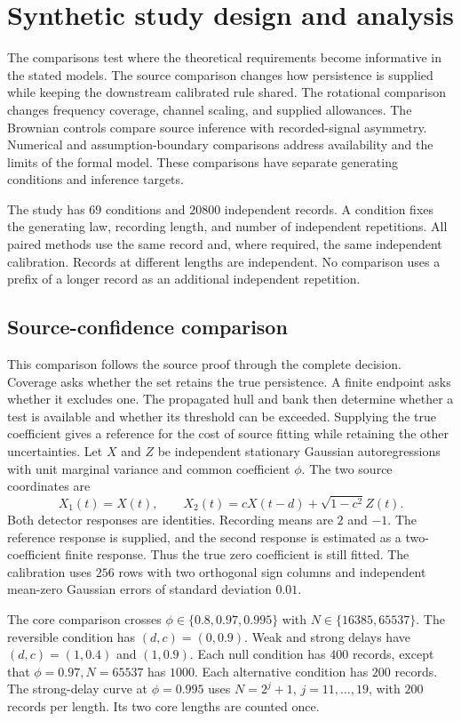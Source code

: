 \section{Synthetic study design and analysis}\label{study16:section}
The comparisons test where the theoretical requirements become informative in the stated models. The source comparison changes how persistence is supplied while keeping the downstream calibrated rule shared. The rotational comparison changes frequency coverage, channel scaling, and supplied allowances. The Brownian controls compare source inference with recorded-signal asymmetry. Numerical and assumption-boundary comparisons address availability and the limits of the formal model. These comparisons have separate generating conditions and inference targets.

The study has $69$ conditions and $20800$ independent records. A condition fixes the generating law, recording length, and number of independent repetitions. All paired methods use the same record and, where required, the same independent calibration. Records at different lengths are independent. No comparison uses a prefix of a longer record as an additional independent repetition.

\subsection{Source-confidence comparison}
This comparison follows the source proof through the complete decision. Coverage asks whether the set retains the true persistence. A finite endpoint asks whether it excludes one. The propagated hull and bank then determine whether a test is available and whether its threshold can be exceeded. Supplying the true coefficient gives a reference for the cost of source fitting while retaining the other uncertainties.
Let $X$ and $Z$ be independent stationary Gaussian autoregressions with unit marginal variance and common coefficient $\phi$. The two source coordinates are
\[
 X_1(t)=X(t),\qquad X_2(t)=cX(t-d)+\sqrt{1-c^2}Z(t).
\]
Both detector responses are identities. Recording means are $2$ and $-1$. The reference response is supplied, and the second response is estimated as a two-coefficient finite response. Thus the true zero coefficient is still fitted. The calibration uses $256$ rows with two orthogonal sign columns and independent mean-zero Gaussian errors of standard deviation $0.01$.

The core comparison crosses $\phi\in\{0.8,0.97,0.995\}$ with $N\in\{16385,65537\}$. The reversible condition has $(d,c)=(0,0.9)$. Weak and strong delays have $(d,c)=(1,0.4)$ and $(1,0.9)$. Each null condition has $400$ records, except that $\phi=0.97,N=65537$ has $1000$. Each alternative condition has $200$ records. The strong-delay curve at $\phi=0.995$ uses $N=2^j+1$, $j=11,\ldots,19$, with $200$ records per length. Its two core lengths are counted once.

